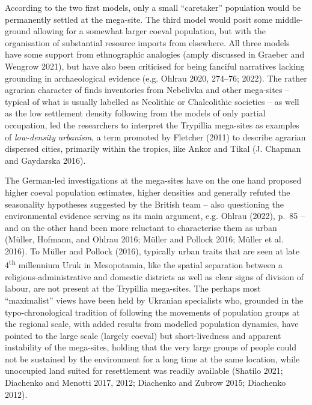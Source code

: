 \documentclass[
  12pt,
  a4paper, twoside]{book}
\begin{document}
According to the two first models, only a small ``caretaker'' population would be permanently settled at the mega-site. The third model would posit some middle-ground allowing for a somewhat larger coeval population, but with the organisation of substantial resource imports from elsewhere. All three models have some support from ethnographic analogies (amply discussed in Graeber and Wengrow 2021), but have also been criticised for being fanciful narratives lacking grounding in archaeological evidence (e.g. Ohlrau 2020, 274--76; 2022). The rather agrarian character of finds inventories from Nebelivka and other mega-sites -- typical of what is usually labelled as Neolithic or Chalcolithic societies -- as well as the low settlement density following from the models of only partial occupation, led the researchers to interpret the Trypillia mega-sites as examples of \emph{low-density} \emph{urbanism}, a term promoted by Fletcher (2011) to describe agrarian dispersed cities, primarily within the tropics, like Ankor and Tikal (J. Chapman and Gaydarska 2016).

The German-led investigations at the mega-sites have on the one hand proposed higher coeval population estimates, higher densities and generally refuted the seasonality hypotheses suggested by the British team -- also questioning the environmental evidence serving as its main argument, e.g. Ohlrau (2022), p.~85 -- and on the other hand been more reluctant to characterise them as urban (Müller, Hofmann, and Ohlrau 2016; Müller and Pollock 2016; Müller et al. 2016). To Müller and Pollock (2016), typically urban traits that are seen at late 4\textsuperscript{th} millennium Uruk in Mesopotamia, like the spatial separation between a religious-administrative and domestic districts as well as clear signs of division of labour, are not present at the Trypillia mega-sites. The perhaps most ``maximalist'' views have been held by Ukranian specialists who, grounded in the typo-chronological tradition of following the movements of population groups at the regional scale, with added results from modelled population dynamics, have pointed to the large scale (largely coeval) but short-livedness and apparent instability of the mega-sites, holding that the very large groups of people could not be sustained by the environment for a long time at the same location, while unoccupied land suited for resettlement was readily available (Shatilo 2021; Diachenko and Menotti 2017, 2012; Diachenko and Zubrow 2015; Diachenko 2012).
\end{document}
